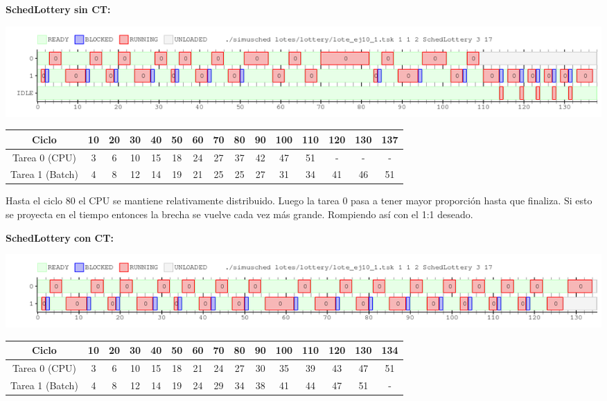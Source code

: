 \begin{flushleft}
\textbf{SchedLottery sin CT:}\end{flushleft} %

\begin{center}
 \includegraphics[scale=0.48]{./Lottery/ej10_SIN_CT.png}
\end{center}

\begin{center}
\begin{tabular}{|c|c|c|c|c|c|c|c|c|c|c|c|c|c|c|}
\hline
Ciclo & 10 & 20 & 30 & 40 & 50 & 60 & 70 & 80 & 90 & 100 & 110 & 120 & 130 & 137\\
\hline
\hline
Tarea 0 (CPU) & 3 & 6 & 10 & 15 & 18 & 24 & 27 & 37 & 42 & 47 & 51 & - & - & - \\
\hline
Tarea 1 (Batch) & 4 & 8 & 12 & 14 & 19 & 21 & 25 & 25 & 27 & 31 & 34 & 41 & 46 & 51 \\
\hline
\end{tabular}\end{center}

Hasta el ciclo 80 el CPU se mantiene relativamente distribuido. Luego la tarea 0 pasa a tener mayor proporción hasta que finaliza. 
Si esto se proyecta en el tiempo entonces la brecha se vuelve cada vez más grande. Rompiendo así con el 1:1 deseado.

\begin{flushleft}
\textbf{SchedLottery con CT:}\end{flushleft} %

\begin{center}
 \includegraphics[scale=0.48]{./Lottery/ej10_CON_CT.png}
\end{center}

\begin{center}
\begin{tabular}{|c|c|c|c|c|c|c|c|c|c|c|c|c|c|c|}
\hline
Ciclo & 10 & 20 & 30 & 40 & 50 & 60 & 70 & 80 & 90 & 100 & 110 & 120 & 130 & 134 \\
\hline
\hline
Tarea 0 (CPU) & 3 & 6 & 10 & 15 & 18 & 21 & 24 & 27 & 30 & 35 & 39 & 43 & 47 & 51\\
\hline
Tarea 1 (Batch) & 4 & 8 & 12 & 14 & 19 & 24 & 29 & 34 & 38 & 41 & 44 & 47 & 51 & -\\
\hline
\end{tabular}\end{center}

